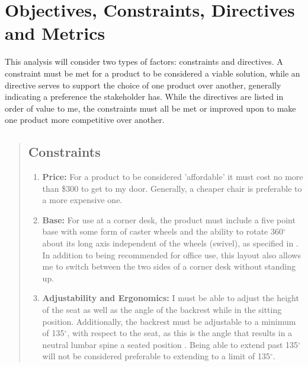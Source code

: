 \documentclass[11pt]{article}
\begin{document}
    \section{Objectives, Constraints, Directives and Metrics}
    This analysis will consider two types of factors: constraints and directives. A constraint must be met for a product to be considered a viable solution, while an directive serves to support the choice of one product over another, generally indicating a preference the stakeholder has. While the directives are listed in order of value to me, the constraints must all be met or improved upon to make one product more competitive over another.
    \begin{quote}
        \subsection{Constraints}
        \begin{enumerate}
            \item \textbf{Price:} For a product to be considered 'affordable' it must cost no more than \$300 to get to my door. Generally, a cheaper chair is preferable to a more expensive one.
            \item \textbf{Base:} For use at a corner desk, the product must include a five point base with some form of caster wheels and the ability to rotate 360$^\circ$ about its long axis independent of the wheels (swivel), as specified in \cite{seating-viewing-considerations}. In addition to being recommended for office use, this layout also allows me to switch between the two sides of a corner desk without standing up.
            \item \textbf{Adjustability and Ergonomics:} I must be able to adjust the height of the seat as well as the angle of the backrest while in the sitting position. Additionally, the backrest must be adjustable to a minimum of 135$^\circ$, with respect to the seat, as this is the angle that results in a neutral lumbar spine a seated position \cite{keegan1953alterations}. Being able to extend past 135$^\circ$ will not be considered preferable to extending to a limit of 135$^\circ$.
            \end{enumerate}


\end{quote}
\end{document}
